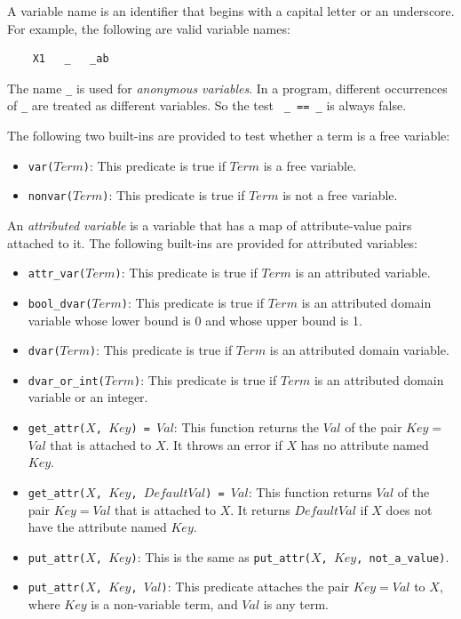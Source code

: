 A variable name is an identifier that begins with a capital letter or an underscore. For example, the following are valid variable names:
\begin{verbatim}
    X1   _   _ab
\end{verbatim}
The name \verb+_+ is used for \emph{anonymous variables}. In a program, different occurrences of \verb+_+ are treated as different variables. So the test \verb+ _ == _+ is always false.

The following two built-ins are provided to test whether a term is a free variable:
\begin{itemize}
\item \texttt{var($Term$)}: This predicate is true if $Term$ is a free variable.
\item \texttt{nonvar($Term$)}: This predicate is true if $Term$ is not a free variable.
\end{itemize}

An \emph{attributed variable} is a variable that has a map of attribute-value pairs attached to it. The following built-ins are provided for attributed variables:

\begin{itemize}
\item \texttt{attr\_var($Term$)}: This predicate is true if $Term$ is an attributed variable.
\item \texttt{bool\_dvar($Term$)}: This predicate is true if $Term$ is an attributed domain variable whose lower bound is 0 and whose upper bound is 1.
\item \texttt{dvar($Term$)}: This predicate is true if $Term$ is an attributed domain variable.
\item \texttt{dvar\_or\_int($Term$)}: This predicate is true if $Term$ is an attributed domain variable or an integer.
\item \texttt{get\_attr($X$, $Key$) = $Val$}: This function returns the \texttt{$Val$} of the pair \texttt{$Key$$=$$Val$} that is attached to \texttt{$X$}. It throws an error if \texttt{$X$} has no attribute named $Key$.
\item \texttt{get\_attr($X$, $Key$, $DefaultVal$) = $Val$}: This function returns \texttt{$Val$} of the pair \texttt{$Key$$=$$Val$} that is attached to \texttt{$X$}. It returns $DefaultVal$ if $X$ does not have the attribute named $Key$.
\item \texttt{put\_attr($X$, $Key$)}: This is the same as \texttt{put\_attr($X$, $Key$, not\_a\_value)}.
\item \texttt{put\_attr($X$, $Key$, $Val$)}: This predicate attaches the pair \texttt{$Key$$=$$Val$} to \texttt{$X$}, where \texttt{$Key$} is a non-variable term, and \texttt{$Val$} is any term. 
\end{itemize}


